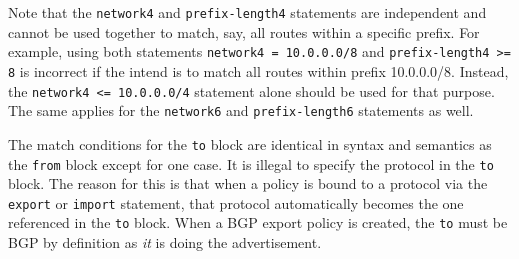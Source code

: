 Note that the {\tt network4} and {\tt prefix-length4} statements
are independent and cannot be used together to match, say, all routes
within a specific prefix. For example, using both statements
{\tt network4 = 10.0.0.0/8} and {\tt prefix-length4 >= 8} is incorrect
if the intend is to match all routes within prefix 10.0.0.0/8.
Instead, the {\tt network4 <= 10.0.0.0/4} statement alone should be used
for that purpose.
The same applies for the {\tt network6} and {\tt prefix-length6}
statements as well.

The match conditions for the {\tt to} block are identical in syntax and
semantics as the {\tt from} block except for one case.  It is illegal to specify
the protocol in the {\tt to} block.  The reason for this is that when a policy
is bound to a protocol via the {\tt export} or {\tt import} statement, that
protocol automatically becomes the one referenced in the {\tt to} block.  When a
BGP export policy is created, the {\tt to} must be BGP by definition as {\em it}
is doing the advertisement.

